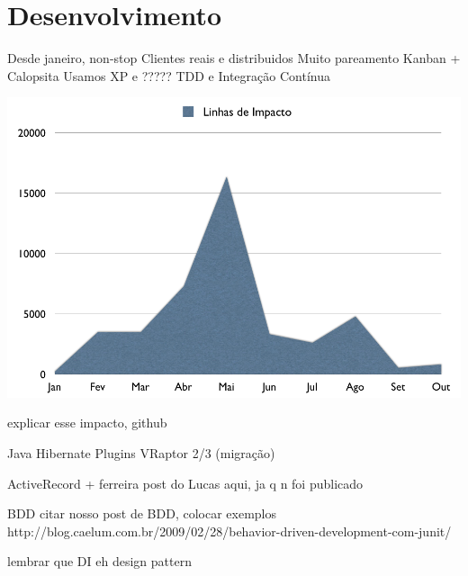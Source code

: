 \section{Desenvolvimento}

Desde janeiro, non-stop
Clientes reais e distribuidos
Muito pareamento
Kanban + Calopsita
Usamos XP e ?????
TDD e Integração Contínua

\includegraphics[scale=0.4]{images/impacto.png}

explicar esse impacto, github

Java
Hibernate
Plugins
VRaptor 2/3 (migração)

ActiveRecord + ferreira
post do Lucas aqui, ja q n foi publicado

BDD
citar nosso post de BDD, colocar exemplos
http://blog.caelum.com.br/2009/02/28/behavior-driven-development-com-junit/

lembrar que DI eh design pattern
